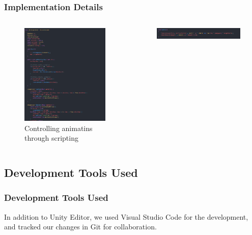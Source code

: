 \documentclass{beamer}
\begin{document}
\begin{frame}
\frametitle{Implementation Details}

    \begin{columns}
    \begin{figure}
        \includegraphics[width=\textwidth,keepaspectratio]{animations_scripting}
        \caption{Controlling animatins through scripting}
    \end{figure}
        \begin{figure}
            \includegraphics[width=\textwidth,keepaspectratio]{update}
        \end{figure}
    \end{columns}


\end{frame}

\subsection{Development Tools Used}
\begin{frame}
\frametitle{Development Tools Used}
In addition to Unity Editor, we used Visual Studio Code for the development, and tracked our changes in Git for collaboration.
\end{frame}
\end{document}
